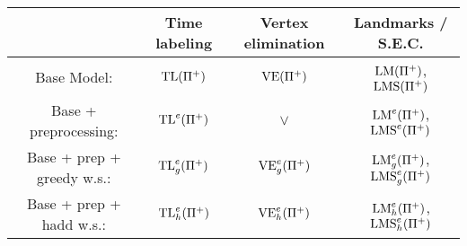 \begin{center}
    \begin{tabular}{ |c|c|c|c| } 
      \hline
         & Time labeling & Vertex elimination & Landmarks / S.E.C. \\
      \hline
      Base Model: & $\mbox{TL}(\Pi^+)$ & $\mbox{VE}(\Pi^+)$ & $\mbox{LM}(\Pi^+)$, $\mbox{LMS}(\Pi^+)$ \\
      \hline
      Base + preprocessing: & $\mbox{TL}^e(\Pi^+)$ & $\vee$ & $\mbox{LM}^e(\Pi^+)$, $\mbox{LMS}^e(\Pi^+)$ \\
      \hline
      Base + prep + greedy w.s.: & $\mbox{TL}^e_g(\Pi^+)$ & $\mbox{VE}^e_g(\Pi^+)$ & $\mbox{LM}^e_g(\Pi^+)$, $\mbox{LMS}^e_g(\Pi^+)$ \\
      \hline
      Base + prep + hadd w.s.: & $\mbox{TL}^e_h(\Pi^+)$ & $\mbox{VE}^e_h(\Pi^+)$ & $\mbox{LM}^e_h(\Pi^+)$, $\mbox{LMS}^e_h(\Pi^+)$ \\
      \hline
    \end{tabular}
\end{center}